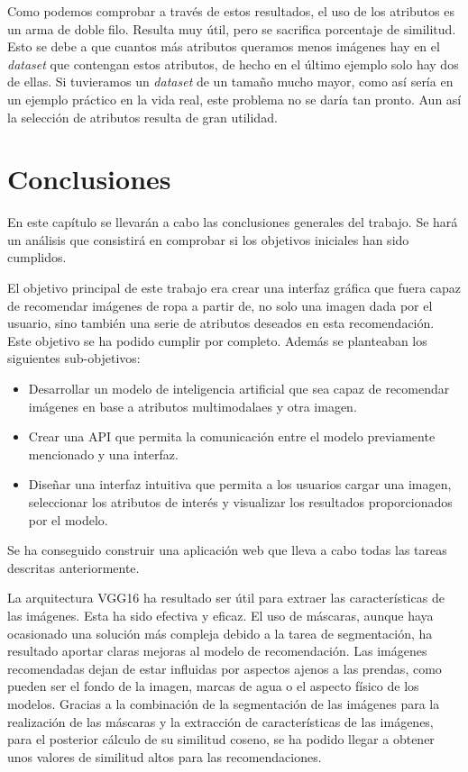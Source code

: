 \documentclass[12pt]{report} %
\begin{document}
	Como podemos comprobar a través de estos resultados, el uso de los atributos es un arma de doble filo. Resulta muy útil, pero se sacrifica porcentaje de similitud.
	Esto se debe a que cuantos más atributos queramos menos imágenes hay en el \textit{dataset} que contengan estos atributos, de hecho en el último ejemplo
	solo hay dos de ellas. Si tuvieramos un \textit{dataset} de un tamaño mucho mayor, como así sería en un ejemplo práctico en la vida real, este problema no se daría
	tan pronto. Aun así la selección de atributos resulta de gran utilidad.

	\chapter{Conclusiones}

	En este capítulo se llevarán a cabo las conclusiones generales del trabajo.
	Se hará un análisis que consistirá en comprobar si los objetivos iniciales han sido cumplidos.

	El objetivo principal de este trabajo era crear una interfaz gráfica que fuera capaz de recomendar imágenes de ropa
	a partir de, no solo una imagen dada por el usuario, sino también una serie de atributos deseados en esta recomendación.
	Este objetivo se ha podido cumplir por completo. Además se planteaban los siguientes sub-objetivos:
	\begin{itemize}
		\item Desarrollar un modelo de inteligencia artificial que sea capaz de recomendar imágenes en base a atributos multimodalaes y otra imagen.
		\item Crear una API que permita la comunicación entre el modelo previamente mencionado y una interfaz.
		\item Diseñar una interfaz intuitiva que permita a los usuarios cargar una imagen, seleccionar los atributos de interés y visualizar los resultados proporcionados por el modelo.
	\end{itemize}
	Se ha conseguido construir una aplicación web que lleva a cabo todas las tareas descritas anteriormente.

	La arquitectura VGG16 ha resultado ser útil para extraer las características de las imágenes. Esta ha sido efectiva y eficaz.
	El uso de máscaras, aunque haya ocasionado una solución más compleja debido a la tarea de segmentación, ha resultado aportar
	claras mejoras al modelo de recomendación. Las imágenes recomendadas dejan de estar influidas por aspectos ajenos a las prendas,
	como pueden ser el fondo de la imagen, marcas de agua o el aspecto físico de los modelos. Gracias a la combinación de la segmentación
	de las imágenes para la realización de las máscaras y la extracción de características de las imágenes, para el posterior cálculo de
	su similitud coseno, se ha podido llegar a obtener unos valores de similitud altos para las recomendaciones.
\end{document}
